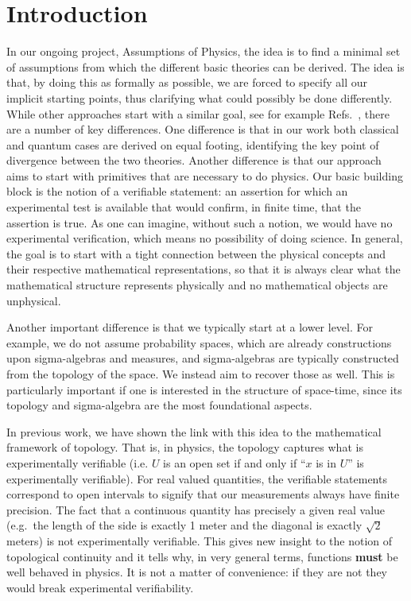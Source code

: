 \documentclass[12pt]{iopart}
\begin{document}
\section{Introduction}
In our ongoing project, Assumptions of Physics, the idea is to find a minimal set of assumptions from which the different basic theories can be derived. The idea is that, by doing this as formally as possible, we are forced to specify all our implicit starting points, thus clarifying what could possibly be done differently. While other approaches start with a similar goal, see for example Refs.~\cite{PhysRevA.84.012311,QLogicReview,Hardy:2001jk,ludwig_hein_2013}, there are a number of key differences. One difference is that in our work both classical and quantum cases are derived on equal footing, identifying the key point of divergence between the two theories.\cite{Carc1} Another difference is that our approach aims to start with primitives that are necessary to do physics. Our basic building block is the notion of a verifiable statement: an assertion for which an experimental test is available that would confirm, in finite time, that the assertion is true. As one can imagine, without such a notion, we would have no experimental verification, which means no possibility of doing science. In general, the goal is to start with a tight connection between the physical concepts and their respective mathematical representations, so that it is always clear what the mathematical structure represents physically and no mathematical objects are unphysical.

Another important difference is that we typically start at a lower level. For example, we do not assume probability spaces, which are already constructions upon sigma-algebras and measures, and sigma-algebras are typically constructed from the topology of the space. We instead aim to recover those as well. This is particularly important if one is interested in the structure of space-time, since its topology and sigma-algebra are the most foundational aspects.

In previous work\cite{Carc2}, we have shown the link with this idea to the mathematical framework of topology. That is, in physics, the topology captures what is experimentally verifiable (i.e. $U$ is an open set if and only if ``$x$ is in $U$'' is experimentally verifiable). For real valued quantities, the verifiable statements correspond to open intervals to signify that our measurements always have finite precision. The fact that a continuous quantity has precisely a given real value (e.g.~the length of the side is exactly 1 meter and the diagonal is exactly $\sqrt{2}$ meters) is not experimentally verifiable. This gives new insight to the notion of topological continuity and it tells why, in very general terms, functions \textbf{must} be well behaved in physics. It is not a matter of convenience: if they are not they would break experimental verifiability.
\end{document}
